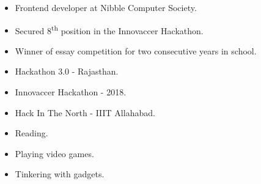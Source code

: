 \documentclass[10pt,a4paper,ragged2e]{altacv}
\newcommand{\ts}{\textsuperscript}
\begin{document}
{}
\smallskip
\begin{itemize}
\item Frontend developer at Nibble Computer Society.
\smallskip
\item Secured 8\ts{th} position in the Innovaccer Hackathon.
\smallskip
\item Winner of essay competition for two consecutive years in school. 
\end{itemize}


\smallskip
\begin{itemize}
\item Hackathon 3.0 - Rajasthan.
\smallskip
\item Innovaccer Hackathon - 2018.
\smallskip
\item Hack In The North - IIIT Allahabad.
\end{itemize}

\smallskip
\begin{itemize}
\item Reading.
\smallskip
\item Playing video games.
\smallskip
\item Tinkering with gadgets.
\end{itemize}




\end{document}
